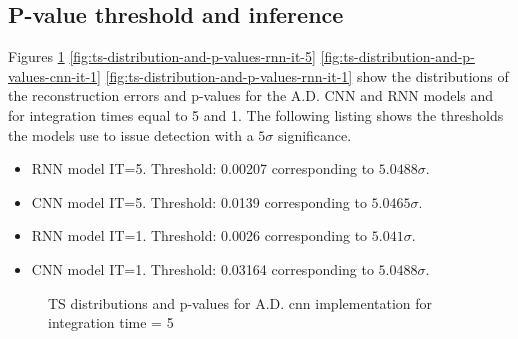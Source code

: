 \subsection{P-value threshold and inference}
\label{s:P-Val-Inference}
Figures \ref{fig:ts-distribution-and-p-values-cnn-it-5}
\ref{fig:ts-distribution-and-p-values-rnn-it-5}
\ref{fig:ts-distribution-and-p-values-cnn-it-1}
\ref{fig:ts-distribution-and-p-values-rnn-it-1} show the distributions of the reconstruction errors and p-values for the A.D. CNN and RNN models and for integration times equal to 5 and 1. The following listing shows the thresholds the models use to issue detection with a $5\sigma$ significance. 
\begin{itemize}
    \item RNN model IT=5. Threshold: 0.00207 corresponding to $5.0488\sigma$.
    \item CNN model IT=5. Threshold: 0.0139 corresponding to $5.0465\sigma$.
    \item RNN model IT=1. Threshold: 0.0026 corresponding to $5.041\sigma$.
    \item CNN model IT=1. Threshold: 0.03164 corresponding to $5.0488\sigma$.
\end{itemize}

\begin{figure}
    \centering
    
    
    \caption{TS distributions and p-values for A.D. cnn implementation for integration time = 5}
    \label{fig:ts-distribution-and-p-values-cnn-it-5}
\end{figure}

